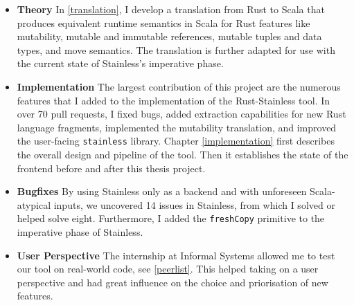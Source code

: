 \begin{itemize}

\item \textbf{Theory} In \autoref{translation}, I develop a translation from
Rust to Scala that produces equivalent runtime semantics in Scala for Rust
features like mutability, mutable and immutable references, mutable tuples and
data types, and move semantics. The translation is further adapted for use with
the current state of Stainless's imperative phase.

\item \textbf{Implementation} The largest contribution of this project are the
numerous features that I added  to the implementation of the Rust-Stainless
tool. In over 70 pull requests, I fixed bugs, added extraction capabilities for
new Rust language fragments, implemented the mutability translation, and
improved the user-facing \lstinline!stainless! library. Chapter
\ref{implementation} first describes the overall design and pipeline of the
tool. Then it establishes the state of the frontend before and after this thesis
project.

\item \textbf{Bugfixes} By using Stainless only as a backend and with unforeseen
Scala-atypical inputs, we uncovered 14 issues in Stainless, from which I solved
or helped solve eight. Furthermore, I added the \lstinline!freshCopy! primitive
to the imperative phase of Stainless.

\item \textbf{User Perspective} The internship at Informal Systems allowed me to
test our tool on real-world code, see \autoref{peerlist}. This helped taking on
a user perspective and had great influence on the choice and priorisation of new
features.

\end{itemize}
